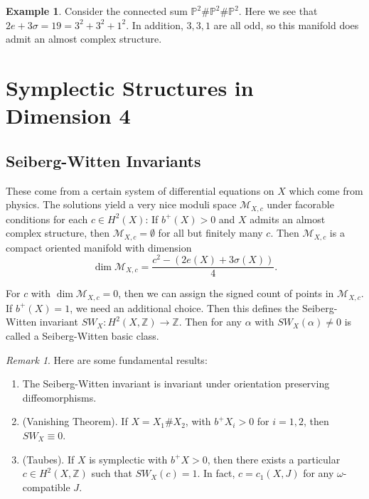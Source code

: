 \documentclass[leqno, openany]{memoir}
\theoremstyle{definition}
\newtheorem{exm}[thm]{Example}
\theoremstyle{remark}
\newtheorem{rmk}[thm]{Remark}
\theoremstyle{plain}
\theoremstyle{definition}
\theoremstyle{remark}
\newcommand{\Z}{\mathbb{Z}}
\renewcommand{\P}{\mathbb{P}}
\newcommand{\mc}[1]{\mathcal{#1}}
\begin{document}
\begin{exm} Consider the connected sum $\P^2 \# \P^2 \# \P^2$. Here we see that
$2e + 3 \sigma = 19 = 3^2 + 3^2 + 1^2$. In addition, $3,3,1$ are all odd, so
this manifold does admit an almost complex structure.  \end{exm}

\section{Symplectic Structures in Dimension 4}%
\label{sec:symplectic_structures_in_dimension_4}

\subsection{Seiberg-Witten Invariants}%

These come from a certain system of differential equations on $X$ which come
from physics. The solutions yield a very nice moduli space $\mc{M}_{X,c}$ under
facorable conditions for each $c \in H^2(X)$: If $b^+(X) > 0$ and $X$ admits an
almost complex structure, then $\mc{M}_{X,c} = \emptyset$ for all but finitely
many $c$. Then $\mc{M}_{X,c}$ is a compact oriented manifold with dimension \[
\dim \mc{M}_{X,c} = \frac{c^2 - (2e(X) + 3\sigma(X))}{4}. \]

For $c$ with $\dim \mc{M}_{X,c} = 0$, then we can assign the signed count of
points in $\mc{M}_{X,c}$. If $b^+(X) = 1$, we need an additional choice. Then
this defines the Seiberg-Witten invariant $SW_X: H^2(X, \Z) \to \Z$. Then for
any $\alpha$ with $SW_X(\alpha) \neq 0$ is called a Seiberg-Witten basic class.

\begin{rmk} Here are some fundamental results: \begin{enumerate} \item The
    Seiberg-Witten invariant is invariant under orientation preserving
    diffeomorphisms.  \item (Vanishing Theorem). If $X = X_1 \# X_2$, with $b^+
    X_i > 0$ for $i = 1,2$, then $SW_X \equiv 0$.  \item (Taubes). If $X$ is
    symplectic with $b^+ X > 0$, then there exists a particular $c \in H^2(X,
    \Z)$ such that $SW_X(c) = 1$. In fact, $c = c_1(X, J)$ for any
    $\omega$-compatible $J$.  \end{enumerate} \end{rmk}
\end{document}
